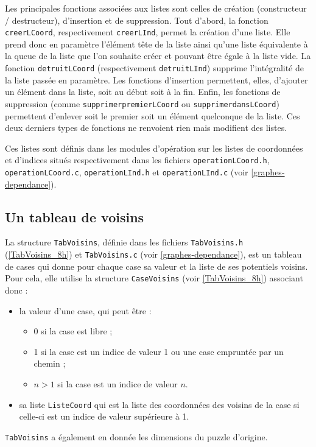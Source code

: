 Les principales fonctions associées aux listes sont celles de création (constructeur / destructeur), d'insertion et de suppression.
Tout d’abord, la fonction \verb|creerLCoord|, respectivement \verb|creerLInd|, permet la création d’une liste. Elle prend donc en paramètre l'élément tête de la liste ainsi qu'une liste équivalente à la queue de la liste que l'on souhaite créer et pouvant être égale à la liste vide. 
La fonction \verb|detruitLCoord| (respectivement \verb|detruitLInd|) supprime l’intégralité de la liste passée en paramètre.
Les fonctions d’insertion permettent, elles, d’ajouter un élément dans la liste, soit au début soit à la fin.
Enfin, les fonctions de suppression (comme \verb|supprimerpremierLCoord| ou \verb|supprimerdansLCoord|) permettent d’enlever soit le premier soit un élément quelconque de la liste.
Ces deux derniers types de fonctions ne renvoient rien mais modifient des listes.

Ces listes sont définis dans les modules d'opération sur les listes de coordonnées et d'indices situés respectivement dans les fichiers \verb$operationLCoord.h$, \verb$operationLCoord.c$, \verb$operationLInd.h$ et \verb$operationLInd.c$ (voir \ref{graphes-dependance}).

\subsection{Un tableau de voisins}

La structure \verb$TabVoisins$, définie dans les fichiers \verb$TabVoisins.h$ (\ref{TabVoisins_8h}) et \verb$TabVoisins.c$ (voir \ref{graphes-dependance}), est un tableau de cases qui donne pour chaque case sa valeur et la liste de ses potentiels voisins. Pour cela, elle utilise la structure \verb$CaseVoisins$ (voir \ref{TabVoisins_8h}) associant donc :
\begin{itemize}
\item la valeur d'une case, qui peut être : 
	\begin{itemize}
	\item 0 si la case est libre ;
	\item 1 si la case est un indice de valeur 1 ou une case empruntée par un chemin ; 
	\item $n > 1$ si la case est un indice de valeur $n$.
	\end{itemize}
\item sa liste \verb$ListeCoord$ qui est la liste des coordonnées des voisins de la case si celle-ci est un indice de valeur supérieure à 1. 
\end{itemize}
\verb$TabVoisins$ a également en donnée les dimensions du puzzle d’origine.


